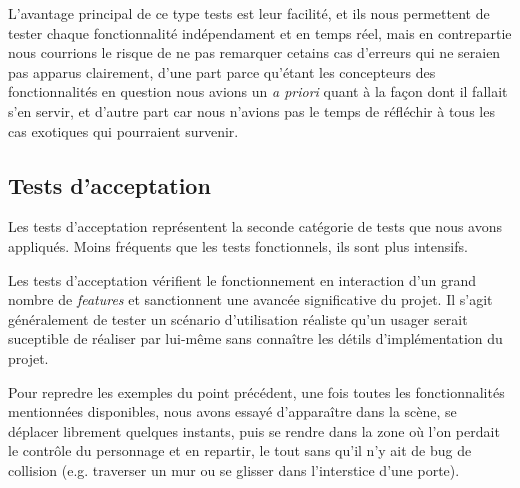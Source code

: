 L'avantage principal de ce type tests est leur facilité, et ils nous permettent de tester chaque fonctionnalité indépendament et en temps réel, mais en contrepartie nous courrions le risque de ne pas remarquer cetains cas d'erreurs qui ne seraien pas apparus clairement, d'une part parce qu'étant les concepteurs des fonctionnalités en question nous avions un \textit{a priori} quant à la façon dont il fallait s'en servir, et d'autre part car nous n'avions pas le temps de réfléchir à tous les cas exotiques qui pourraient survenir. 

\subsection{Tests d'acceptation}

Les tests d'acceptation représentent la seconde catégorie de tests que nous avons appliqués. Moins fréquents que les tests fonctionnels, ils sont plus intensifs. \newline

Les tests d'acceptation vérifient le fonctionnement en interaction d'un grand nombre de \textit{features} et sanctionnent une avancée significative du projet. Il s'agit généralement de tester un scénario d'utilisation réaliste qu'un usager serait suceptible de réaliser par lui-même sans connaître les détils d'implémentation du projet. \newline

Pour repredre les exemples du point précédent, une fois toutes les fonctionnalités mentionnées disponibles, nous avons essayé d'apparaître dans la scène, se déplacer librement quelques instants, puis se rendre dans la zone où l'on perdait le contrôle du personnage et en repartir, le tout sans qu'il n'y ait de bug de collision (e.g. traverser un mur ou se glisser dans l'interstice d'une porte). 